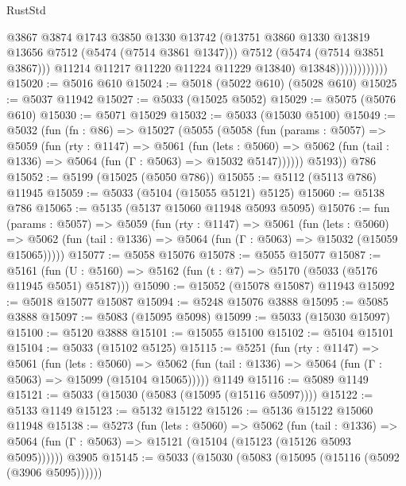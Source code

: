 \begin{lexlean}{RustStd}
\begin{coremodule}
                                @3867
                                @3874
                                @1743
                                @3850
                                @1330
                                @13742
                                (@13751 @3860 @1330 @13819 @13656 @7512 (@5474 (@7514 @3861 @1347)))
                                @7512
                                (@5474 (@7514 @3851 @3867)))
                              @11214
                              @11217
                              @11220
                              @11224
                              @11229
                              @13840)
                            @13848))))))))))))
@15020 := @5016 @610
@15024 := @5018 (@5022 @610) (@5028 @610)
@15025 := @5037 @11942
@15027 := @5033 (@15025 @5052)
@15029 := @5075 (@5076 @610)
@15030 := @5071 @15029
@15032 := @5033 (@15030 @5100)
@15049 := @5032
    (fun (fn : @86) =>
    @15027
      (@5055
        (@5058
          (fun (params : @5057) =>
          @5059
            (fun (rty : @1147) =>
            @5061
              (fun (lets : @5060) =>
              @5062 (fun (tail : @1336) => @5064 (fun (Γ : @5063) => @15032 @5147))))))
        @5193))
    @786
@15052 := @5199 (@15025 (@5050 @786))
@15055 := @5112 (@5113 @786) @11945
@15059 := @5033 (@5104 (@15055 @5121) @5125)
@15060 := @5138 @786
@15065 := @5135 (@5137 @15060 @11948 @5093 @5095)
@15076 := fun (params : @5057) =>
  @5059
    (fun (rty : @1147) =>
    @5061
      (fun (lets : @5060) =>
      @5062 (fun (tail : @1336) => @5064 (fun (Γ : @5063) => @15032 (@15059 @15065)))))
@15077 := @5058 @15076
@15078 := @5055 @15077
@15087 := @5161
    (fun (U : @5160) => @5162 (fun (t : @7) => @5170 (@5033 (@5176 @11945 @5051) @5187)))
@15090 := @15052 (@15078 @15087) @11943
@15092 := @5018 @15077 @15087
@15094 := @5248 @15076 @3888
@15095 := @5085 @3888
@15097 := @5083 (@15095 @5098)
@15099 := @5033 (@15030 @15097)
@15100 := @5120 @3888
@15101 := @15055 @15100
@15102 := @5104 @15101
@15104 := @5033 (@15102 @5125)
@15115 := @5251
    (fun (rty : @1147) =>
    @5061
      (fun (lets : @5060) =>
      @5062 (fun (tail : @1336) => @5064 (fun (Γ : @5063) => @15099 (@15104 @15065)))))
    @1149
@15116 := @5089 @1149
@15121 := @5033 (@15030 (@5083 (@15095 (@15116 @5097))))
@15122 := @5133 @1149
@15123 := @5132 @15122
@15126 := @5136 @15122 @15060 @11948
@15138 := @5273
    (fun (lets : @5060) =>
    @5062
      (fun (tail : @1336) =>
      @5064 (fun (Γ : @5063) => @15121 (@15104 (@15123 (@15126 @5093 @5095))))))
    @3905
@15145 := @5033 (@15030 (@5083 (@15095 (@15116 (@5092 (@3906 @5095))))))

\end{coremodule}
\end{lexlean}
